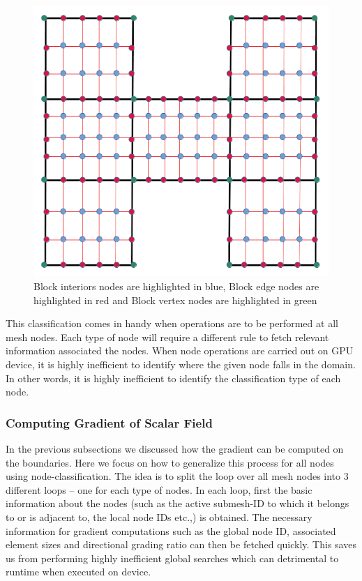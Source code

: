 \documentclass[a4paper,12pt]{article}
\begin{document}
\begin{figure}[H]
	\centering
	\includegraphics[scale=0.4]{figures/NodeClassification.png}
	\caption{Block interiors nodes are highlighted in blue, Block edge nodes are highlighted in red and Block vertex nodes are highlighted in green}
\end{figure}

This classification comes in handy when operations are to be performed at all mesh nodes. Each type of node will require a different rule to fetch relevant information associated the nodes. When node operations are carried out on GPU device, it is highly inefficient to identify where the given node falls in the domain. In other words, it is highly inefficient to identify the classification type of each node.

\subsubsection{Computing Gradient of Scalar Field}
In the previous subsections we discussed how the gradient can be computed on the boundaries. Here we focus on how to generalize this process for all nodes using node-classification. The idea is to split the loop over all mesh nodes into 3 different loops -- one for each type of nodes. In each loop, first the basic information about the nodes (such as the active submesh-ID to which it belongs to or is adjacent to, the local node IDs etc.,) is obtained. The necessary information for gradient computations such as the global node ID, associated element sizes and directional grading ratio can then be fetched quickly. This saves us from performing highly inefficient global searches which can detrimental to runtime when executed on device. 
\end{document}
